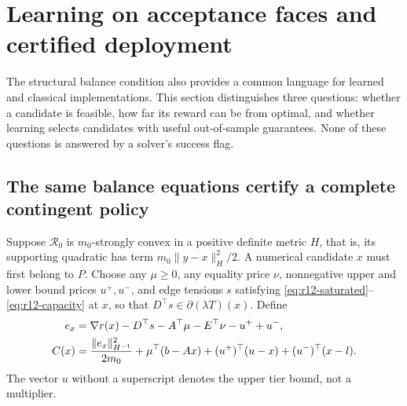 \documentclass[11pt,letterpaper]{article}
\theoremstyle{definition}
\newcommand{\1}{\mathbf 1}
\begin{document}


\section{Learning on acceptance faces and certified deployment}\label{sec:r12-bridge}
The structural balance condition also provides a common language for learned and classical implementations. This section distinguishes three questions: whether a candidate is feasible, how far its reward can be from optimal, and whether learning selects candidates with useful out-of-sample guarantees. None of these questions is answered by a solver's success flag.

\subsection{The same balance equations certify a complete contingent policy}
Suppose $\mathcal R_0$ is $m_0$-strongly convex in a positive definite metric $H$, that is, its supporting quadratic has term $m_0\|y-x\|_H^2/2$. A numerical candidate $x$ must first belong to $P$. Choose any $\mu\geq0$, any equality price $\nu$, nonnegative upper and lower bound prices $u^+,u^-$, and edge tensions $s$ satisfying \eqref{eq:r12-saturated}--\eqref{eq:r12-capacity} at $x$, so that $D^\top s\in\partial(\lambda T)(x)$. Define
\begin{align}
 e_x&=\nabla r(x)-D^\top s-A^\top\mu-E^\top\nu-u^++u^-,\notag\\
 C(x)&=\frac{\|e_x\|_{H^{-1}}^2}{2m_0}
    +\mu^\top(b-Ax)+(u^+)^\top(u-x)+(u^-)^\top(x-l).\label{eq:r12-certificate}
\end{align}
The vector $u$ without a superscript denotes the upper tier bound, not a multiplier.
\end{document}
